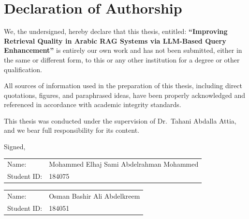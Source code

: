 \chapter*{Declaration of Authorship}

%

We, the undersigned, hereby declare that this thesis, entitled: \textbf{``Improving Retrieval
Quality in Arabic RAG Systems via LLM-Based Query Enhancement''} is entirely our own work and
has not been submitted, either in the same or different form, to this or any other institution
for a degree or other qualification.

All sources of information used in the preparation of this thesis, including direct quotations,
figures, and paraphrased ideas, have been properly acknowledged and referenced in accordance
with academic integrity standards.

This thesis was conducted under the supervision of Dr.~Tahani Abdalla Attia, and we bear full
responsibility for its content.

Signed,

\vspace{1cm}

\noindent
\begin{tabular}{@{}p{2.2cm}l@{}}
Name:       & Mohammed Elhaj Sami Abdelrahman Mohammed \\
Student ID: & 184075 \\
\end{tabular}

\vspace{1.2cm}

\noindent
\begin{tabular}{@{}p{2.2cm}l@{}}
Name:       & Osman Bashir Ali Abdelkreem \\
Student ID: & 184051 \\
\end{tabular}
